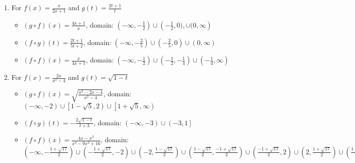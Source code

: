 \begin{enumerate}
\begin{itemize}
\end{itemize}


\item For    $f(x) = \frac{x}{2x+1}$ and $g(t) = \frac{2t+1}{t}$

\begin{itemize}

\item  $(g \circ f)(x) = \frac{4x+1}{x}$, domain: $\left(-\infty, -\frac{1}{2}\right) \cup \left(-\frac{1}{2}, 0), \cup (0, \infty\right)$

\item  $(f \circ g)(t) = \frac{2t+1}{5t+2}$, domain:  $\left(-\infty, -\frac{2}{5}\right) \cup \left(-\frac{2}{5}, 0\right) \cup (0,\infty)$

\item  $(f \circ f)(x) = \frac{x}{4x+1}$, domain: $\left(-\infty, -\frac{1}{2}\right) \cup \left(-\frac{1}{2}, -\frac{1}{4} \right) \cup \left(-\frac{1}{4},\infty\right)$

\end{itemize}




\item For  $f(x) = \frac{2x}{x^2-4}$ and $g(t) =\sqrt{1-t}$ 

\begin{itemize}

\item  $(g \circ f)(x) =\sqrt{\frac{x^2-2x-4}{x^2-4}}$, domain: $\left(-\infty, -2\right) \cup \left[1-\sqrt{5}, 2\right) \cup \left[1+\sqrt{5}, \infty\right)$

\item  $(f \circ g)(t) = -\frac{2\sqrt{1-t}}{t+3}$, domain: $\left(-\infty, -3\right) \cup \left(-3, 1\right]$

\item  $(f \circ f)(x) = \frac{4x-x^3}{x^4-9x^2+16}$, domain: $\left(-\infty, -\frac{1+\sqrt{17}}{2}\right) \cup \left(-\frac{1+\sqrt{17}}{2}, -2\right) \cup \left(-2, \frac{1-\sqrt{17}}{2}\right) \cup \left(\frac{1-\sqrt{17}}{2}, \frac{-1+\sqrt{17}}{2}\right) \cup \left(\frac{-1+\sqrt{17}}{2}, 2\right) \cup \left(2, \frac{1+\sqrt{17}}{2} \right) \cup \left(\frac{1+\sqrt{17}}{2}, \infty\right)$

\end{itemize}
\setcounter{HW}{\value{enumi}}
\end{enumerate}


